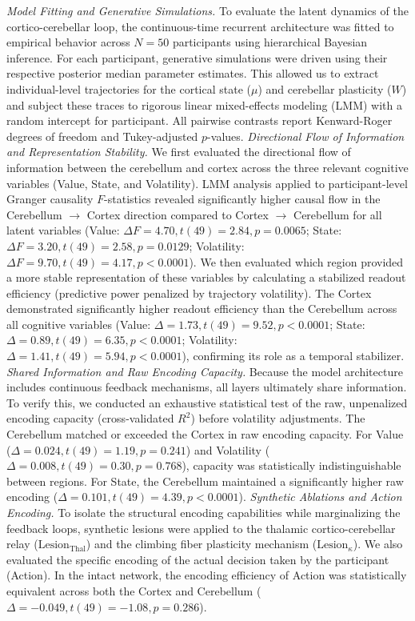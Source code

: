 \documentclass[12pt, a4paper]{extarticle}
\begin{document}
	\textit{Model Fitting and Generative Simulations.} To evaluate the latent dynamics of the cortico-cerebellar loop, the continuous-time recurrent architecture was fitted to empirical behavior across $N=50$ participants using hierarchical Bayesian inference. For each participant, generative simulations were driven using their respective posterior median parameter estimates. This allowed us to extract individual-level trajectories for the cortical state ($\mu$) and cerebellar plasticity ($W$) and subject these traces to rigorous linear mixed-effects modeling (LMM) with a random intercept for participant. All pairwise contrasts report Kenward-Roger degrees of freedom and Tukey-adjusted $p$-values.
	\textit{Directional Flow of Information and Representation Stability.} We first evaluated the directional flow of information between the cerebellum and cortex across the three relevant cognitive variables (Value, State, and Volatility). LMM analysis applied to participant-level Granger causality $F$-statistics revealed significantly higher causal flow in the Cerebellum $\rightarrow$ Cortex direction compared to Cortex $\rightarrow$ Cerebellum for all latent variables (Value: $\Delta F = 4.70, t(49) = 2.84, p = 0.0065$; State: $\Delta F = 3.20, t(49) = 2.58, p = 0.0129$; Volatility: $\Delta F = 9.70, t(49) = 4.17, p < 0.0001$). 
	We then evaluated which region provided a more stable representation of these variables by calculating a stabilized readout efficiency (predictive power penalized by trajectory volatility). The Cortex demonstrated significantly higher readout efficiency than the Cerebellum across all cognitive variables (Value: $\Delta = 1.73, t(49) = 9.52, p < 0.0001$; State: $\Delta = 0.89, t(49) = 6.35, p < 0.0001$; Volatility: $\Delta = 1.41, t(49) = 5.94, p < 0.0001$), confirming its role as a temporal stabilizer.
	\textit{Shared Information and Raw Encoding Capacity.} Because the model architecture includes continuous feedback mechanisms, all layers ultimately share information. To verify this, we conducted an exhaustive statistical test of the raw, unpenalized encoding capacity (cross-validated $R^2$) before volatility adjustments. The Cerebellum matched or exceeded the Cortex in raw encoding capacity. For Value ($\Delta = 0.024, t(49) = 1.19, p = 0.241$) and Volatility ($\Delta = 0.008, t(49) = 0.30, p = 0.768$), capacity was statistically indistinguishable between regions. For State, the Cerebellum maintained a significantly higher raw encoding ($\Delta = 0.101, t(49) = 4.39, p < 0.0001$). 
	\textit{Synthetic Ablations and Action Encoding.} To isolate the structural encoding capabilities while marginalizing the feedback loops, synthetic lesions were applied to the thalamic cortico-cerebellar relay ($\text{Lesion}_{\text{Thal}}$) and the climbing fiber plasticity mechanism ($\text{Lesion}_{\kappa}$). We also evaluated the specific encoding of the actual decision taken by the participant (Action). In the intact network, the encoding efficiency of Action was statistically equivalent across both the Cortex and Cerebellum ($\Delta = -0.049, t(49) = -1.08, p = 0.286$).
\end{document}
